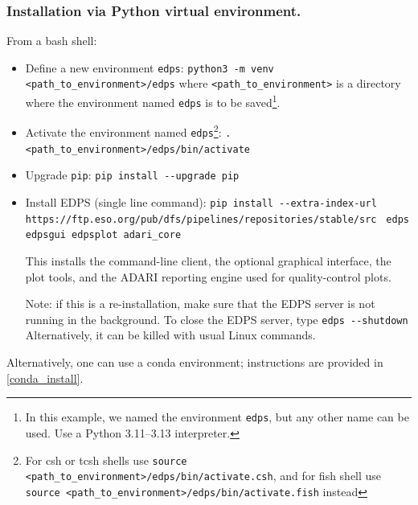 \subsubsection{Installation via Python virtual environment.}

From a bash shell:
\begin{itemize}

    \item Define a new environment {\tt edps}:\newline 
    \verb|python3 -m venv  <path_to_environment>/edps| \newline
    where {\tt <path\_to\_environment>} is a directory where the environment named {\tt edps} is to be saved\footnote{In this example, we named the environment {\tt edps}, but any other name can be used. Use a Python 3.11--3.13 interpreter.}. 
\medskip
   \item Activate the  environment named {\tt edps}\footnote{\label{foot:cshfish}For csh or tcsh shells use {\tt source  <path\_to\_environment>/edps/bin/activate.csh}, and for fish shell use {\tt source  <path\_to\_environment>/edps/bin/activate.fish} instead}: \newline
   \verb|. <path_to_environment>/edps/bin/activate|
\medskip

   \item Upgrade {\tt pip}:\newline
   \verb|pip install --upgrade pip|
\medskip

   \item Install EDPS (single line command): \newline
   \verb|pip install --extra-index-url | \newline
   \verb| https://ftp.eso.org/pub/dfs/pipelines/repositories/stable/src|\newline
   \verb| edps edpsgui edpsplot adari_core|

\medskip

This installs the command-line client, the optional graphical interface, the plot tools, and the ADARI reporting engine used for quality-control plots.

Note: if this is a re-installation, make sure that the EDPS server is not running in the background. To close the EDPS server, type 
\verb|edps --shutdown |
Alternatively, it can be killed with usual Linux commands.

\end{itemize}
Alternatively, one can use a conda environment; instructions are provided in \ref{conda_install}.



